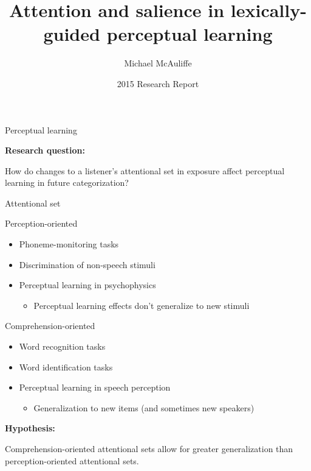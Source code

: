 \documentclass{beamer}
\title
{Attention and salience in lexically-guided perceptual learning}
\author
{Michael McAuliffe}
\institute
{}
\date
{2015 Research Report}
\begin{document}
\begin{frame}
  \titlepage
\end{frame}


\begin{frame}{Perceptual learning}
\hfill
{}

\vfill
\textbf{Research question:}

How do changes to a listener's attentional set in exposure affect perceptual learning in future categorization?
\vfill

\end{frame}

\begin{frame}{Attentional set}

Perception-oriented
\begin{itemize}
\item Phoneme-monitoring tasks
\item Discrimination of non-speech stimuli
\item Perceptual learning in psychophysics
\begin{itemize}
\item Perceptual learning effects don't generalize to new stimuli
\end{itemize}
\end{itemize}

Comprehension-oriented
\begin{itemize}
\item Word recognition tasks
\item Word identification tasks
\item Perceptual learning in speech perception
\begin{itemize}
\item Generalization to new items (and sometimes new speakers)
\end{itemize}
\end{itemize}

\vfill
\textbf{Hypothesis:}

Comprehension-oriented attentional sets allow for greater generalization than perception-oriented attentional sets.
\vfill

\end{frame}
\end{document}
